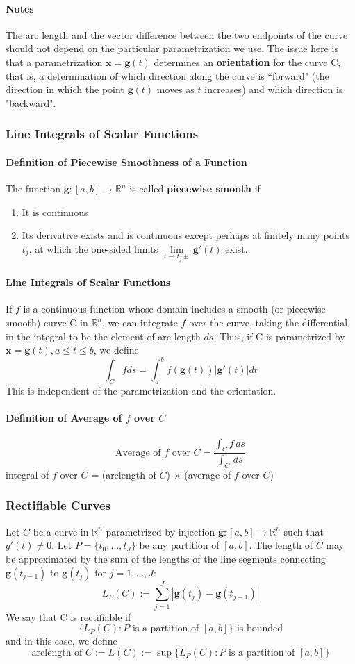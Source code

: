 \documentclass[11pt]{article}
\newcommand{\tb}[1]{\textbf{#1}}
\newcommand{\real}[0]{\mathbb{R}}
\newcommand{\under}[1]{\underline{#1}}
\newcommand{\vx}[0]{\tb{x}}
\begin{document}
\paragraph{Notes} The arc length and the vector difference between the two endpoints of the curve should not depend on the particular parametrization we use. The issue here is that a parametrization $\vx = \tb{g}(t)$ determines an \tb{orientation} for the curve C, that is, a determination of which direction along the curve is ``forward" (the direction in which the point $\tb{g}(t)$ moves as $t$ increases) and which direction is "backward". 
\subsubsection{Line Integrals of Scalar Functions} 
\paragraph{Definition of Piecewise Smoothness of a Function} The function $\tb{g}: [a,b] \rightarrow \real^n$ is called \tb{piecewise smooth} if
\begin{enumerate}
    \item It is continuous
    \item Its derivative exists and is continuous except perhaps at finitely many points $t_j$, at which the one-sided limits $\underset{t\rightarrow t_j\pm}{\lim}\tb{g}'(t)$ exist. 
\end{enumerate}
\paragraph{Line Integrals of Scalar Functions} 
If $f$ is a continuous function whose domain includes a smooth (or piecewise smooth) curve C in $\real^n$, we can integrate $f$ over the curve, taking the differential in the integral to be the element of arc length $ds$. Thus, if C is parametrized by $\vx = \tb{g}(t), a\leq t \leq b$, we define
$$\int_C f ds = \int_a^b f(\tb{g}(t))|\tb{g}'(t)|dt$$ This is independent of the parametrization and the orientation.
\paragraph{Definition of Average of $f$ over $C$}
$$\mbox{Average of $f$ over $C$} = \frac{\int_C f\, ds}{\int_C \, ds}$$
integral of $f$ over $C$ = (arclength of $C$) $\times$ (average of $f$ over $C$)
\subsubsection{Rectifiable Curves}
Let $C$ be a curve in $\real^n$ parametrized by injection $\tb{g}: [a,b] \rightarrow \real^n$ such that $g'(t) \neq 0$. Let $P = \{t_0, \hdots, t_J\}$ be any partition of $[a,b]$. The length of $C$ may be approximated by the sum of the lengths of the line segments connecting $\tb{g}(t_{j-1})$ to $\tb{g}(t_j)$ for $j = 1, \hdots, J$:
$$L_P(C) := \sum_{j=1}^J |\tb{g}(t_j) - \tb{g}(t_{j-1})|$$
We say that C is \under{rectifiable} if
$$\{L_P(C): P \mbox{ is a partition of } [a,b]\} \mbox{ is bounded}$$
and in this case, we define
$$\mbox{arclength of }C := L(C) := \sup\{L_P(C): P \mbox{ is a partition of } [a,b]\}$$
\end{document}
